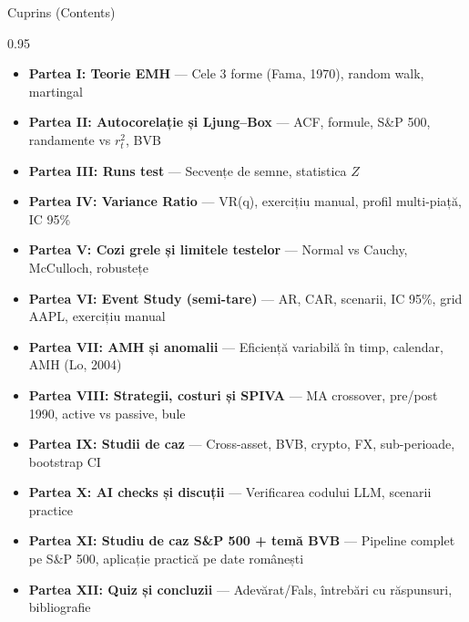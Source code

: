 \documentclass[9pt, aspectratio=169, t]{beamer}
\subtitle{Seminar: Ipoteza Pieței Eficiente}
\begin{document}
\newcommand{\ch}[1]{\href{https://colab.research.google.com/github/QuantLet/Stat_fin_markets/blob/master/Ch_04/SFM_ch4_#1/SFM_ch4_#1.ipynb}{#1}}

{
\begin{frame}
    \titlepage
\end{frame}
}

\begin{frame}[shrink=15]{Cuprins (Contents)}
\begin{cminipage}{0.95\textwidth}
\begin{itemize}\setlength{\itemsep}{0pt}
    \item \textbf{Partea I: Teorie EMH} --- Cele 3 forme (Fama, 1970), random walk, martingal
    \item \textbf{Partea II: Autocorelație și Ljung--Box} --- ACF, formule, S\&P 500, randamente vs $r_t^2$, BVB
    \item \textbf{Partea III: Runs test} --- Secvențe de semne, statistica $Z$
    \item \textbf{Partea IV: Variance Ratio} --- VR(q), exercițiu manual, profil multi-piață, IC 95\%
    \item \textbf{Partea V: Cozi grele și limitele testelor} --- Normal vs Cauchy, McCulloch, robustețe
    \item \textbf{Partea VI: Event Study (semi-tare)} --- AR, CAR, scenarii, IC 95\%, grid AAPL, exercițiu manual
    \item \textbf{Partea VII: AMH și anomalii} --- Eficiență variabilă în timp, calendar, AMH (Lo, 2004)
    \item \textbf{Partea VIII: Strategii, costuri și SPIVA} --- MA crossover, pre/post 1990, active vs passive, bule
    \item \textbf{Partea IX: Studii de caz} --- Cross-asset, BVB, crypto, FX, sub-perioade, bootstrap CI
    \item \textbf{Partea X: AI checks și discuții} --- Verificarea codului LLM, scenarii practice
    \item \textbf{Partea XI: Studiu de caz S\&P 500 + temă BVB} --- Pipeline complet pe S\&P 500, aplicație practică pe date românești
    \item \textbf{Partea XII: Quiz și concluzii} --- Adevărat/Fals, întrebări cu răspunsuri, bibliografie
\end{itemize}
\end{cminipage}
\end{frame}
\end{document}
